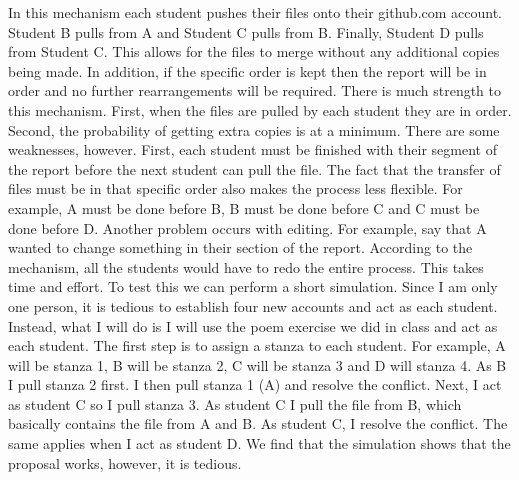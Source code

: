 \documentclass[12pt]{article}
\begin{document}
 In this mechanism each student pushes their files onto their github.com account. Student B pulls from A and Student C pulls from B. Finally, Student D pulls from Student C. This allows for the files to merge without any additional copies being made. In addition, if the specific order is kept then the report will be in order and no further rearrangements will be required. 
\newline 
\newline 
There is much strength to this mechanism. First, when the files are pulled by each student they are in order. Second, the probability of getting extra copies is at a minimum. There are some weaknesses, however. First, each student must be finished with their segment of the report before the next student can pull the file. The fact that the transfer of files must be in that specific order also makes the process less flexible. For example, A must be done before B, B must be done before C and C must be done before D. Another problem occurs with editing. For example, say that A wanted to change something in their section of the report. According to the mechanism, all the students would have to redo the entire process. This takes time and effort.
\newline 
\newline 
To test this we can perform a short simulation. Since I am only one person, it is tedious to establish four new accounts and act as each student. Instead, what I will do is I will use the poem exercise we did in class and act as each student. The first step is to assign a stanza to each student. For example, A will be stanza 1, B will be stanza 2, C will be stanza 3 and D will stanza 4. As B I pull stanza 2 first. I then pull stanza 1 (A) and resolve the conflict. Next, I act as student C so I pull stanza 3. As student C I pull the file from B, which basically contains the file from A and B. As student C, I resolve the conflict. The same applies when I act as student D. We find that the simulation shows that the proposal works, however, it is tedious. 
 
\end{document}
